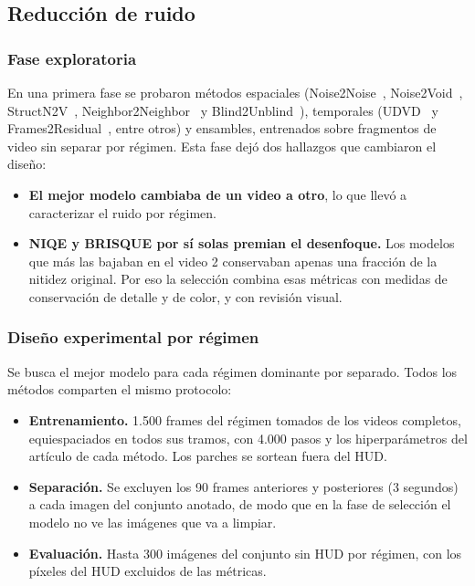 \subsection{Reducción de ruido}

\subsubsection{Fase exploratoria}
En una primera fase se probaron métodos espaciales (Noise2Noise~\cite{lehtinen2018noise2noise}, Noise2Void~\cite{krull2019noise2void}, StructN2V~\cite{broaddus2020structn2v}, Neighbor2Neighbor~\cite{huang2021neighbor2neighbor} y Blind2Unblind~\cite{wang2022blind2unblind}), temporales (UDVD~\cite{sheth2021udvd} y Frames2Residual~\cite{ji2026frames2residual}, entre otros) y ensambles, entrenados sobre fragmentos de video sin separar por régimen. Esta fase dejó dos hallazgos que cambiaron el diseño:

\begin{itemize}
    \item \textbf{El mejor modelo cambiaba de un video a otro}, lo que llevó a caracterizar el ruido por régimen.
    \item \textbf{NIQE y BRISQUE por sí solas premian el desenfoque.} Los modelos que más las bajaban en el video 2 conservaban apenas una fracción de la nitidez original. Por eso la selección combina esas métricas con medidas de conservación de detalle y de color, y con revisión visual.
\end{itemize}

\subsubsection{Diseño experimental por régimen}
Se busca el mejor modelo para cada régimen dominante por separado. Todos los métodos comparten el mismo protocolo:

\begin{itemize}
    \item \textbf{Entrenamiento.} 1.500 frames del régimen tomados de los videos completos, equiespaciados en todos sus tramos, con 4.000 pasos y los hiperparámetros del artículo de cada método. Los parches se sortean fuera del HUD.
    \item \textbf{Separación.} Se excluyen los 90 frames anteriores y posteriores (3 segundos) a cada imagen del conjunto anotado, de modo que en la fase de selección el modelo no ve las imágenes que va a limpiar.
    \item \textbf{Evaluación.} Hasta 300 imágenes del conjunto sin HUD por régimen, con los píxeles del HUD excluidos de las métricas.
\end{itemize}

